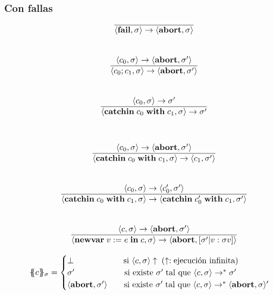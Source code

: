     \subsubsection*{Con fallas}
      \begin{multicols}{2}
        \[\begin{array}{cll}
          \overline{\lang{\fail, \sigma} \rightarrow \lang{\abort, \sigma}} \\ \\ \\

          \lang{c_0, \sigma} \rightarrow \lang{\abort, \sigma'} \\
          \overline{\lang{c_0;c_1, \sigma} \rightarrow \lang{\abort, \sigma'}} \\ \\ \\

          \lang{c_0, \sigma} \rightarrow \sigma' \\
          \overline{\lang{\catch{c_0}{c_1}, \sigma} \rightarrow \sigma'} \\ \\ \\
        \end{array}\]
        \[\begin{array}{cll}
          \langle c_0, \sigma\rangle \rightarrow \langle\textbf{abort}, \sigma'\rangle \\
          \overline{\langle\textbf{catchin}\;c_0\;\textbf{with}\;c_1, \sigma\rangle \rightarrow \langle c_1, \sigma'\rangle} \\ \\ \\
          \langle c_0, \sigma\rangle \rightarrow \langle c'_0, \sigma'\rangle \\
          \overline{\langle\textbf{catchin}\;c_0\;\textbf{with}\;c_1, \sigma\rangle \rightarrow \langle\textbf{catchin}\;c'_0\;\textbf{with}\;c_1, \sigma'\rangle} \\ \\ \\

          \langle c, \sigma\rangle \rightarrow \langle\textbf{abort}, \sigma'\rangle \\
          \overline{\langle\textbf{newvar}\;v := e\;\textbf{in}\;c, \sigma\rangle \rightarrow \langle\textbf{abort}, [\sigma' | v : \sigma v]\rangle}
        \end{array}\]
      \end{multicols}

    \begin{eqnarray*}
      \{\!\!\{c\}\!\!\}_{\sigma} = \begin{cases}
        \bot \qquad\qquad\qquad  \text{si } \langle c, \sigma\rangle \uparrow \; (\uparrow: \text{ejecución infinita}) \\
        \sigma' \qquad\qquad\qquad \text{si existe } \sigma' \; \text{tal que } \langle c, \sigma\rangle \rightarrow^{\ast} \sigma' \\
        \langle\textbf{abort}, \sigma'\rangle \qquad \text{si existe } \sigma' \; \text{tal que } \langle c, \sigma\rangle \rightarrow^{\ast} \langle\textbf{abort}, \sigma\rangle'
      \end{cases}
    \end{eqnarray*}

